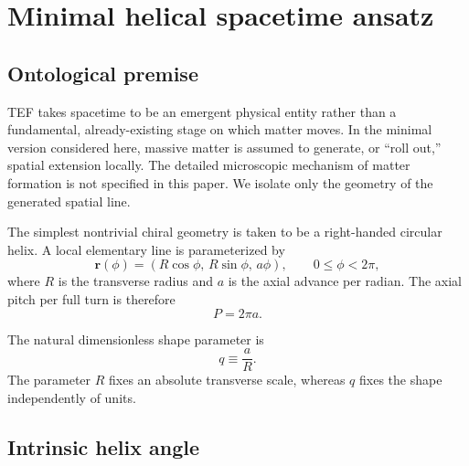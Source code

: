 \documentclass[aps,prd,reprint,nofootinbib,floatfix]{revtex4-2}
\begin{document}
\section{Minimal helical spacetime ansatz}

\subsection{Ontological premise}

TEF takes spacetime to be an emergent physical entity rather than a fundamental, already-existing stage on which matter moves.  In the minimal version considered here, massive matter is assumed to generate, or ``roll out,'' spatial extension locally.  The detailed microscopic mechanism of matter formation is not specified in this paper.  We isolate only the geometry of the generated spatial line.

The simplest nontrivial chiral geometry is taken to be a right-handed circular helix.  A local elementary line is parameterized by
\begin{equation}
\bm r(\phi)=\left(R\cos\phi,\,R\sin\phi,\,a\phi\right),
\qquad 0\leq\phi<2\pi,
\label{eq:helix}
\end{equation}
where $R$ is the transverse radius and $a$ is the axial advance per radian.  The axial pitch per full turn is therefore
\begin{equation}
P=2\pi a.
\label{eq:pitch}
\end{equation}

The natural dimensionless shape parameter is
\begin{equation}
q\equiv\frac{a}{R}.
\label{eq:qdef}
\end{equation}
The parameter $R$ fixes an absolute transverse scale, whereas $q$ fixes the shape independently of units.

\subsection{Intrinsic helix angle}
\end{document}

